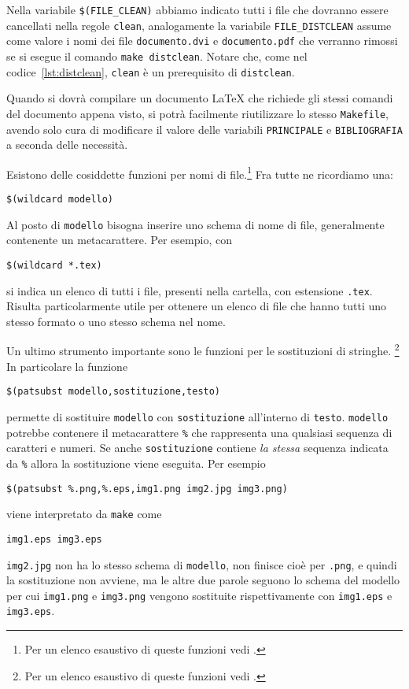Nella variabile \verb|$(FILE_CLEAN)|
abbiamo indicato tutti i file che dovranno essere cancellati nella regole
\verb|clean|, analogamente la variabile \verb|FILE_DISTCLEAN| assume come valore
i nomi dei file \verb|documento.dvi| e \verb|documento.pdf| che verranno rimossi
se si esegue il comando \verb|make distclean|.  Notare che, come nel
codice~\ref{lst:distclean}, \verb|clean| è un prerequisito di \verb|distclean|.

Quando si dovrà compilare un documento \LaTeX{}
che richiede gli stessi comandi del documento appena visto, si potrà facilmente
riutilizzare lo stesso \verb|Makefile|, avendo solo cura di modificare il valore
delle variabili \verb|PRINCIPALE| e \verb|BIBLIOGRAFIA| a seconda delle
necessità. %

Esistono delle cosiddette funzioni per nomi di
file.\footnote{Per un elenco esaustivo di queste funzioni vedi
  \textcite[83]{gnu:make}.} Fra tutte ne ricordiamo una:
\begin{lstlisting}
$(wildcard modello)
\end{lstlisting}
Al posto di \verb|modello| bisogna inserire uno schema di nome di file,
generalmente contenente un metacarattere. Per esempio, con
\begin{lstlisting}
$(wildcard *.tex)
\end{lstlisting}
si indica un elenco di tutti i file, presenti nella cartella, con estensione
\verb|.tex|.  Risulta particolarmente utile per ottenere un elenco di file che
hanno tutti uno stesso formato o uno stesso schema nel nome.

Un ultimo strumento importante sono le funzioni per le sostituzioni di
stringhe.%
\footnote{Per un elenco esaustivo di queste funzioni vedi
  \textcite[80]{gnu:make}.}  In particolare la funzione
\begin{lstlisting}
$(patsubst modello,sostituzione,testo)
\end{lstlisting}
permette di sostituire \verb|modello| con \verb|sostituzione| all'interno di
\verb|testo|.  \verb|modello| potrebbe contenere il metacarattere \verb|%| che
rappresenta una qualsiasi sequenza di caratteri e numeri.  Se anche
\verb|sostituzione| contiene \emph{la stessa} sequenza indicata da \verb|%|
allora la sostituzione viene eseguita.  Per esempio
\begin{lstlisting}
$(patsubst %.png,%.eps,img1.png img2.jpg img3.png)
\end{lstlisting}
viene interpretato da \verb|make| come
\begin{verbatim}
img1.eps img3.eps
\end{verbatim}
\verb|img2.jpg| non ha lo stesso schema di \verb|modello|, non finisce cioè per
\verb|.png|, e quindi la sostituzione non avviene, ma le altre due parole
seguono lo schema del modello per cui \verb|img1.png| e \verb|img3.png| vengono
sostituite rispettivamente con \verb|img1.eps| e \verb|img3.eps|.


